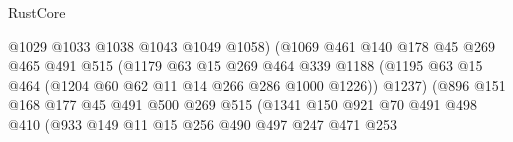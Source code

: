 \begin{lexlean}{RustCore}
\begin{coremodule}
                                        @1029
                                        @1033
                                        @1038
                                        @1043
                                        @1049
                                        @1058)
                                      (@1069
                                        @461
                                        @140
                                        @178
                                        @45
                                        @269
                                        @465
                                        @491
                                        @515
                                        (@1179
                                          @63
                                          @15
                                          @269
                                          @464
                                          @339
                                          @1188
                                          (@1195
                                            @63
                                            @15
                                            @464
                                            (@1204 @60 @62 @11 @14 @266 @286 @1000 @1226))
                                          @1237)
                                        (@896
                                          @151
                                          @168
                                          @177
                                          @45
                                          @491
                                          @500
                                          @269
                                          @515
                                          (@1341
                                            @150
                                            @921
                                            @70
                                            @491
                                            @498
                                            @410
                                            (@933
                                              @149
                                              @11
                                              @15
                                              @256
                                              @490
                                              @497
                                              @247
                                              @471
                                              @253

\end{coremodule}
\end{lexlean}
